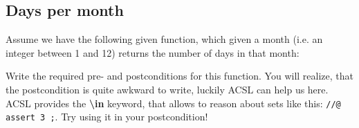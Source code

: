 \subsection{Days per month}

Assume we have the following given function, which given a month (i.e. an integer between 1 and 12) returns the number of days in that month:


Write the required pre- and postconditions for this function. You will realize, that the postcondition is quite awkward to write, luckily ACSL can help us here. ACSL provides the \textbf{\textbackslash in} keyword, that allows to reason about sets like this: \texttt{//@ assert 3 ;}. Try using it in your postcondition! 
